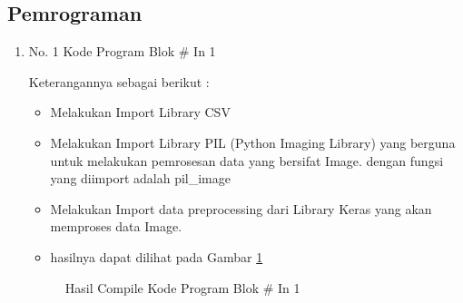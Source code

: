 \subsection{Pemrograman}
\begin{enumerate}

\item No. 1 Kode Program Blok \# In 1
\par 
Keterangannya sebagai berikut :
\begin{itemize}
\item Melakukan Import Library CSV
\item Melakukan Import Library PIL (Python Imaging Library) yang berguna untuk melakukan pemrosesan data yang bersifat Image. dengan fungsi yang diimport adalah pil\_image
\item Melakukan Import data preprocessing dari Library Keras yang akan memproses data Image.
\item hasilnya dapat dilihat pada Gambar \ref{refer12}
\end{itemize}

\begin{figure}[!htbp]
      \caption{Hasil Compile Kode Program Blok \# In 1}
      \label{refer12}
\end{figure}



\end{enumerate}
